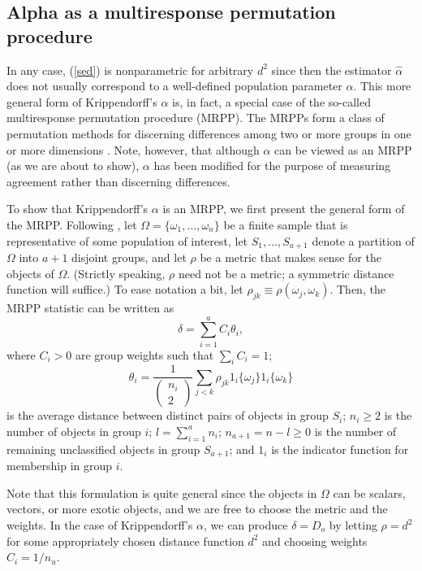 \subsection{Alpha as a multiresponse permutation procedure}
\label{mrpp}

In any case, (\ref{sed}) is nonparametric for arbitrary $d^2$ since then the estimator $\hat{\alpha}$ does not usually correspond to a well-defined population parameter $\alpha$.  This more general form of Krippendorff's $\alpha$ is, in fact, a special case of the so-called multiresponse permutation procedure (MRPP). The MRPPs form a class of permutation methods for discerning differences among two or more groups in one or more dimensions \citep{permutation}. Note, however, that although $\alpha$ can be viewed as an MRPP (as we are about to show), $\alpha$ has been modified for the purpose of measuring agreement rather than discerning differences.

To show that Krippendorff's $\alpha$ is an MRPP, we first present the general form of the MRPP. Following \citeauthor{permutation}, let $\Omega=\{\omega_1,\dots,\omega_n\}$ be a finite sample that is representative of some population of interest, let $S_1,\dots,S_{a+1}$ denote a partition of $\Omega$ into $a+1$ disjoint groups, and let $\rho$ be a metric that makes sense for the objects of $\Omega$. (Strictly speaking, $\rho$ need not be a metric; a symmetric distance function will suffice.) To ease notation a bit, let $\rho_{jk}\equiv\rho(\omega_j,\omega_k)$. Then, the MRPP statistic can be written as
\[
\delta=\sum_{i=1}^aC_i\theta_i,
\]
where $C_i>0$ are group weights such that $\sum_iC_i=1$;
\[
\theta_i=\frac{1}{\begin{pmatrix}n_i\\2\end{pmatrix}}\sum_{j<k}\rho_{jk}1_i\{\omega_j\}1_i\{\omega_k\}
\]
is the average distance between distinct pairs of objects in group $S_i$; $n_i\geq 2$ is the number of objects in group $i$; $l=\sum_{i=1}^an_i$; $n_{a+1}=n-l\geq 0$ is the number of remaining unclassified objects in group $S_{a+1}$; and $1_i$ is the indicator function for membership in group $i$.

Note that this formulation is quite general since the objects in $\Omega$ can be scalars, vectors, or more exotic objects, and we are free to choose the metric and the weights. In the case of Krippendorff's $\alpha$, we can produce $\delta=D_o$ by letting $\rho=d^2$ for some appropriately chosen distance function $d^2$ and choosing weights $C_i=1/n_u$.

